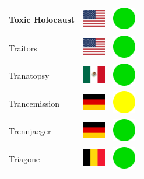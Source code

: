 \documentclass[12pt, a4paper, twoside]{report}
\begin{document}
\begin{center}
\begin{longtable}{|p{5cm}|p{2cm}|p{2cm}|}
 Toxic Holocaust                                            & \includegraphics[width=1cm]{../4x3/us} &   \includegraphics[width=1cm]{../likes/y} \\ \hline
 Traitors                                                   & \includegraphics[width=1cm]{../4x3/us} &   \includegraphics[width=1cm]{../likes/y} \\ \hline
 Tranatopsy                                                 & \includegraphics[width=1cm]{../4x3/mx} &   \includegraphics[width=1cm]{../likes/y} \\ \hline
 Trancemission                                              & \includegraphics[width=1cm]{../4x3/de} &   \includegraphics[width=1cm]{../likes/m} \\ \hline
 Trennjaeger                                                & \includegraphics[width=1cm]{../4x3/de} &   \includegraphics[width=1cm]{../likes/y} \\ \hline
 Triagone                                                   & \includegraphics[width=1cm]{../4x3/be} &   \includegraphics[width=1cm]{../likes/y} \\ \hline

\end{longtable}
\end{center}
\end{document}
